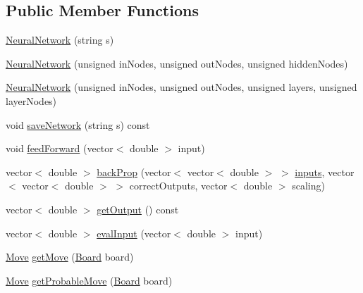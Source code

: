 \subsection*{Public Member Functions}
\begin{DoxyCompactItemize}
\item 
\hyperlink{class_neural_network_ac46a25af2f5a1706adf9e798970939bb}{Neural\+Network} (string s)
\item 
\hyperlink{class_neural_network_aed4b8a61c6cf3e0af6ff9976bf9c4190}{Neural\+Network} (unsigned in\+Nodes, unsigned out\+Nodes, unsigned hidden\+Nodes)
\item 
\hyperlink{class_neural_network_a4cdce541dada0debf1022e3951b8d8cb}{Neural\+Network} (unsigned in\+Nodes, unsigned out\+Nodes, unsigned layers, unsigned layer\+Nodes)
\item 
void \hyperlink{class_neural_network_adf3230528dd4c37960464557c690cbae}{save\+Network} (string s) const
\item 
void \hyperlink{class_neural_network_a7ebe119117046615958557e820b90c67}{feed\+Forward} (vector$<$ double $>$ input)
\item 
vector$<$ double $>$ \hyperlink{class_neural_network_a4416dadd62ac5ec1b645ae1378e21335}{back\+Prop} (vector$<$ vector$<$ double $>$ $>$ \hyperlink{class_neural_network_ae9ab96e97eef53bf8080001cf90075b8}{inputs}, vector$<$ vector$<$ double $>$ $>$ correct\+Outputs, vector$<$ double $>$ scaling)
\item 
vector$<$ double $>$ \hyperlink{class_neural_network_a73d030bfbf3efe8edb0bfd8a7e94ed53}{get\+Output} () const
\item 
vector$<$ double $>$ \hyperlink{class_neural_network_a7566cd3df29d6ed6d8134d2c52c1460a}{eval\+Input} (vector$<$ double $>$ input)
\item 
\hyperlink{struct_move}{Move} \hyperlink{class_neural_network_af773d118844a6dc42c8a4edc05652893}{get\+Move} (\hyperlink{constants_8h_af901d0acc1572fb0c779f84ddd2c6ce8}{Board} board)
\item 
\hyperlink{struct_move}{Move} \hyperlink{class_neural_network_abaeb2ec4b31b2a69985cacec5fd1d685}{get\+Probable\+Move} (\hyperlink{constants_8h_af901d0acc1572fb0c779f84ddd2c6ce8}{Board} board)
\end{DoxyCompactItemize}
